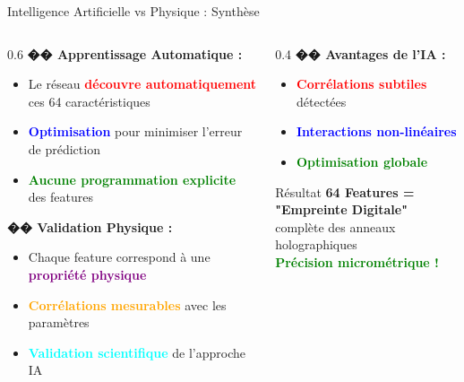 \documentclass[aspectratio=169]{beamer}
\begin{document}
\begin{frame}{Intelligence Artificielle vs Physique : Synthèse}
    \begin{columns}
        \begin{column}{0.6\textwidth}
            \textbf{�� Apprentissage Automatique :}
            \begin{itemize}
                \item Le réseau \textcolor{red}{\textbf{découvre automatiquement}} ces 64 caractéristiques
                \item \textcolor{blue}{\textbf{Optimisation}} pour minimiser l'erreur de prédiction
                \item \textcolor{green}{\textbf{Aucune programmation explicite}} des features
            \end{itemize}

            \vspace{0.3cm}
            \textbf{�� Validation Physique :}
            \begin{itemize}
                \item Chaque feature correspond à une \textcolor{purple}{\textbf{propriété physique}}
                \item \textcolor{orange}{\textbf{Corrélations mesurables}} avec les paramètres
                \item \textcolor{cyan}{\textbf{Validation scientifique}} de l'approche IA
            \end{itemize}
        \end{column}
        \begin{column}{0.4\textwidth}
            \textbf{�� Avantages de l'IA :}
            \begin{itemize}
                \item \textcolor{red}{\textbf{Corrélations subtiles}} détectées
                \item \textcolor{blue}{\textbf{Interactions non-linéaires}}
                \item \textcolor{green}{\textbf{Optimisation globale}}
            \end{itemize}

            \vspace{0.3cm}
            \begin{alertblock}{Résultat}
                \textbf{64 Features = "Empreinte Digitale"} \\
                complète des anneaux holographiques \\
                \textcolor{green}{\textbf{Précision micrométrique !}}
            \end{alertblock}
        \end{column}
    \end{columns}
\end{frame}
\end{document}
